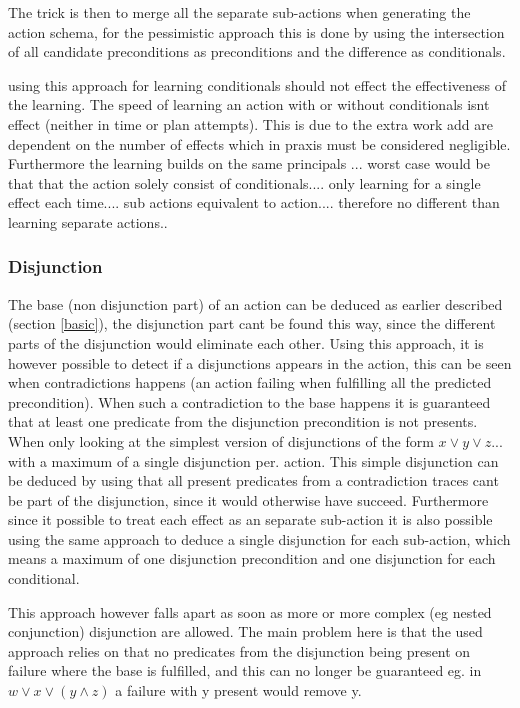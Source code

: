 	The trick is then to merge all the separate sub-actions when generating the action schema, for the pessimistic approach this is done by using the intersection of all candidate preconditions as preconditions and the difference as conditionals.
	
	
using this approach for learning conditionals should not effect the effectiveness of the learning.
	The speed of learning an action with or without conditionals isnt effect (neither in time or plan attempts). This is due to the extra work add are dependent on the number of effects which in praxis must be considered negligible. Furthermore the learning builds on the same principals ...  worst case would be that that the action solely consist of conditionals.... only learning for a single effect each time.... sub actions equivalent to action.... therefore no different than learning separate actions.. 
	

\subsubsection{Disjunction}
	The base (non disjunction part) of an action can be deduced as earlier described (section \ref{basic}), the disjunction part cant be found this way, since the different parts of the disjunction would eliminate each other. Using this approach, it is however possible to detect if a disjunctions appears in the action, this can be seen when contradictions happens (an action failing when fulfilling all the predicted precondition). When such a contradiction to the base happens it is guaranteed that at least one predicate from the disjunction precondition is not presents. When only looking at the simplest version of disjunctions of the form $ x \lor y \lor z...$ with a maximum of a single disjunction per. action. This simple disjunction can be deduced by using that all present predicates from a contradiction traces cant be part of the disjunction, since it would otherwise have succeed. Furthermore since it possible to treat each effect as an separate sub-action it is also possible using the same approach to deduce a single disjunction for each sub-action, which means a maximum of one disjunction precondition and one disjunction for each conditional. 
	
	This approach however falls apart as soon as more or more complex (eg nested conjunction) disjunction are allowed. The main problem here is that the used approach relies on that no predicates from the disjunction being present on failure where the base is fulfilled, and this can no longer be guaranteed eg. in $w \lor x \lor (y \land z )$ a failure with y present would remove y. 
	
